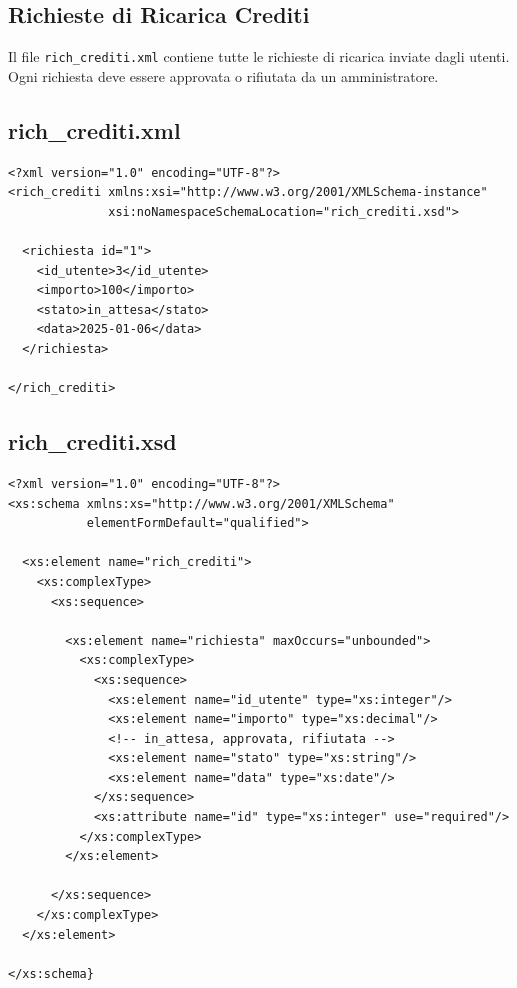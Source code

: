 \documentclass[a4paper,12pt]{report}
\begin{document}

\subsection{Richieste di Ricarica Crediti}

Il file \texttt{rich\_crediti.xml} contiene tutte le richieste di ricarica inviate dagli utenti.
Ogni richiesta deve essere approvata o rifiutata da un amministratore.

\subsection*{rich\_crediti.xml}

\begin{lstlisting}
<?xml version="1.0" encoding="UTF-8"?>
<rich_crediti xmlns:xsi="http://www.w3.org/2001/XMLSchema-instance"
              xsi:noNamespaceSchemaLocation="rich_crediti.xsd">

  <richiesta id="1">
    <id_utente>3</id_utente>
    <importo>100</importo>
    <stato>in_attesa</stato>
    <data>2025-01-06</data>
  </richiesta>

</rich_crediti>
\end{lstlisting}

\subsection*{rich\_crediti.xsd}

\begin{lstlisting}
<?xml version="1.0" encoding="UTF-8"?>
<xs:schema xmlns:xs="http://www.w3.org/2001/XMLSchema"
           elementFormDefault="qualified">

  <xs:element name="rich_crediti">
    <xs:complexType>
      <xs:sequence>

        <xs:element name="richiesta" maxOccurs="unbounded">
          <xs:complexType>
            <xs:sequence>
              <xs:element name="id_utente" type="xs:integer"/>
              <xs:element name="importo" type="xs:decimal"/>
              <!-- in_attesa, approvata, rifiutata -->
              <xs:element name="stato" type="xs:string"/>
              <xs:element name="data" type="xs:date"/>
            </xs:sequence>
            <xs:attribute name="id" type="xs:integer" use="required"/>
          </xs:complexType>
        </xs:element>

      </xs:sequence>
    </xs:complexType>
  </xs:element>

</xs:schema}
\end{lstlisting}
\end{document}
